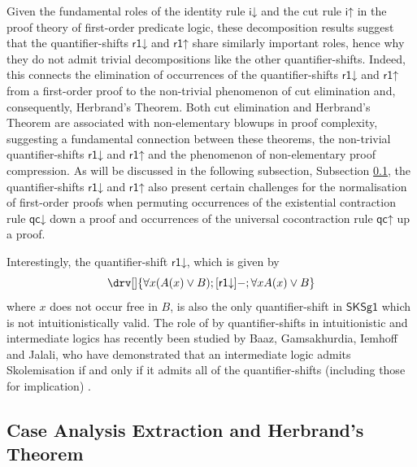 \documentclass[10pt]{article}
\theoremstyle{definition}\newtheorem{remark}[theorem]{Remark}
\theoremstyle{definition}\newtheorem{example}[theorem]{Example}
\theoremstyle{definition}\newtheorem{definition}[theorem]{Definition}
\newcommand{\SKSq}{{\mathsf{SKSg1}}}
\newcommand{\iUp}{{\mathsf{i\mathord\uparrow}}}
\newcommand{\iDown}{{\mathsf{i\mathord\downarrow}}}
\newcommand{\qcUp}{{\mathsf{qc\mathord\uparrow}}}
\newcommand{\qcDown}{{\mathsf{qc\mathord\downarrow}}}
\newcommand{\rOneUp}{{\mathsf{r1\mathord\uparrow}}}
\newcommand{\rOneDown}{{\mathsf{r1\mathord\downarrow}}}
\begin{document}
	Given the fundamental roles of the identity rule $\iDown$ and the cut rule $\iUp$ in the proof theory of first-order predicate logic, these decomposition results suggest that the quantifier-shifts $\rOneDown$ and $\rOneUp$ share similarly important roles, hence why they do not admit trivial decompositions like the other quantifier-shifts. Indeed, this connects the elimination of occurrences of the quantifier-shifts $\rOneDown$ and $\rOneUp$ from a first-order proof to the non-trivial phenomenon of cut elimination and, consequently, Herbrand's Theorem. Both cut elimination \cite{BussIntroductionToProofTheory} and Herbrand's Theorem \cite{StatmanLowerBounds} are associated with non-elementary blowups in proof complexity, suggesting a fundamental connection between these theorems, the non-trivial quantifier-shifts $\rOneDown$ and $\rOneUp$ and the phenomenon of non-elementary proof compression. As will be discussed in the following subsection, Subsection \ref{CaseAnalysisExtractionSection}, the quantifier-shifts $\rOneDown$ and $\rOneUp$ also present certain challenges for the normalisation of first-order proofs when permuting occurrences of the existential contraction rule $\qcDown$ down a proof and occurrences of the universal cocontraction rule $\qcUp$ up a proof.
	
	Interestingly, the quantifier-shift $\rOneDown$, which is given by
	\[
	\drv[] {
		\forall x (A(x) \lor B) ; [\rOneDown]- ; \forall x A(x) \lor B
	}
	\]
	where $x$ does not occur free in $B$, is also the only quantifier-shift in $\SKSq$ which is not intuitionistically valid. The role of by quantifier-shifts in intuitionistic and intermediate logics has recently been studied by Baaz, Gamsakhurdia, Iemhoff and Jalali, who have demonstrated that an intermediate logic admits Skolemisation if and only if it admits all of the quantifier-shifts (including those for implication) \cite{BaazSkolemisationIntermediateLogics}.
	
	\subsection{Case Analysis Extraction and Herbrand's Theorem}\label{CaseAnalysisExtractionSection}
	
\end{document}
